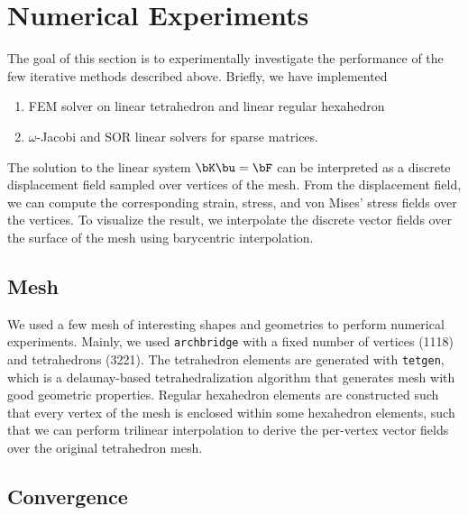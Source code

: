 \documentclass[11pt,titlepage]{article}
\begin{document}
\section{Numerical Experiments}

The goal of this section is to experimentally investigate the performance of the few iterative methods described above. Briefly, we have implemented 
\begin{enumerate}
    \item FEM solver on linear tetrahedron and linear regular hexahedron
    \item $\omega$-Jacobi and SOR linear solvers for sparse matrices. 
\end{enumerate}
The solution to the linear system $\bK \bu = \bF$ can be interpreted as a discrete displacement field sampled over vertices of the mesh. From the displacement field, we can compute the corresponding strain, stress, and von Mises' stress fields over the vertices. To visualize the result, we interpolate the discrete vector fields over the surface of the mesh using barycentric interpolation. 

\subsection{Mesh}

We used a few mesh of interesting shapes and geometries to perform numerical experiments. Mainly, we used \texttt{archbridge} with a fixed number of vertices (1118) and tetrahedrons (3221). The tetrahedron elements are generated with \texttt{tetgen}, which is a delaunay-based tetrahedralization algorithm that generates mesh with good geometric properties. Regular hexahedron elements are constructed such that every vertex of the mesh is enclosed within some hexahedron elements, such that we can perform trilinear interpolation to derive the per-vertex vector fields over the original tetrahedron mesh.

\subsection{Convergence}
\end{document}
